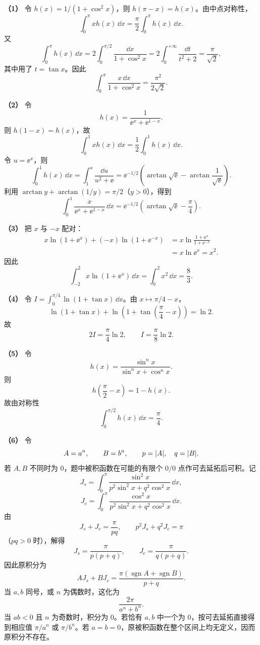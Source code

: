 \begin{xsolution}
\textbf{（1）}\quad
令 $h(x)=1/(1+\cos^2x)$，则 $h(\pi-x)=h(x)$。由中点对称性，
\[
  \int_0^\pi xh(x)\,\dd x
  =\frac\pi2\int_0^\pi h(x)\,\dd x.
\]
又
\[
  \int_0^\pi h(x)\,\dd x
  =2\int_0^{\pi/2}\frac{\dd x}{1+\cos^2x}
  =2\int_0^{+\infty}\frac{\dd t}{t^2+2}
  =\frac\pi{\sqrt2},
\]
其中用了 $t=\tan x$。因此
\[
  \boxed{\int_0^\pi\frac{x\,\dd x}{1+\cos^2x}
  =\frac{\pi^2}{2\sqrt2}}.
\]

\textbf{（2）}\quad
令
\[
  h(x)=\frac1{\ee^x+\ee^{1-x}}.
\]
则 $h(1-x)=h(x)$，故
\[
  \int_0^1xh(x)\,\dd x=\frac12\int_0^1h(x)\,\dd x.
\]
令 $u=\ee^x$，则
\[
  \int_0^1h(x)\,\dd x
  =\int_1^{\ee}\frac{\dd u}{u^2+\ee}
  =\ee^{-1/2}\left(\arctan\sqrt{\ee}-\arctan\frac1{\sqrt\ee}\right).
\]
利用 $\arctan y+\arctan(1/y)=\pi/2$（$y>0$），得到
\[
  \boxed{\int_0^1\frac{x}{\ee^x+\ee^{1-x}}\,\dd x
  =\ee^{-1/2}\left(\arctan\sqrt{\ee}-\frac\pi4\right)}.
\]

\textbf{（3）}\quad
把 $x$ 与 $-x$ 配对：
\begin{align*}
  x\ln(1+\ee^x)+(-x)\ln(1+\ee^{-x})
  &=x\ln\frac{1+\ee^x}{1+\ee^{-x}}\\
  &=x\ln\ee^x=x^2.
\end{align*}
因此
\[
  \int_{-2}^2x\ln(1+\ee^x)\,\dd x
  =\int_0^2x^2\,\dd x
  =\boxed{\frac83}.
\]

\textbf{（4）}\quad
令 $I=\int_0^{\pi/4}\ln(1+\tan x)\,\dd x$。由 $x\mapsto\pi/4-x$，
\[
  \ln(1+\tan x)+
  \ln\left(1+\tan\left(\frac\pi4-x\right)\right)=\ln2.
\]
故
\[
  2I=\frac\pi4\ln2,
  \qquad
  \boxed{I=\frac\pi8\ln2}.
\]

\textbf{（5）}\quad
令
\[
  h(x)=\frac{\sin^n x}{\sin^n x+\cos^n x}.
\]
则
\[
  h\left(\frac\pi2-x\right)=1-h(x).
\]
故由对称性
\[
  \boxed{\int_0^{\pi/2}h(x)\,\dd x=\frac\pi4}.
\]

\textbf{（6）}\quad
令
\[
  A=a^n,\qquad B=b^n,
  \qquad p=\lvert A\rvert,\quad q=\lvert B\rvert.
\]
若 $A,B$ 不同时为 $0$，题中被积函数在可能的有限个 $0/0$ 点作可去延拓后可积。记
\[
  J_s=\int_0^\pi\frac{\sin^2x}{p^2\sin^2x+q^2\cos^2x}\,\dd x,
\]
\[
  J_c=\int_0^\pi\frac{\cos^2x}{p^2\sin^2x+q^2\cos^2x}\,\dd x.
\]
由
\[
  J_s+J_c=\frac\pi{pq},
  \qquad
  p^2J_s+q^2J_c=\pi
\]
（$pq>0$ 时），解得
\[
  J_s=\frac\pi{p(p+q)},
  \qquad
  J_c=\frac\pi{q(p+q)}.
\]
因此原积分为
\[
  AJ_s+BJ_c
  =\boxed{\frac{\pi(\operatorname{sgn}A+\operatorname{sgn}B)}{p+q}}.
\]
当 $a,b$ 同号，或 $n$ 为偶数时，这化为
\[
  \boxed{\frac{2\pi}{a^n+b^n}}.
\]
当 $ab<0$ 且 $n$ 为奇数时，积分为 $0$。若恰有 $a,b$ 中一个为 $0$，按可去延拓直接得到相应值 $\pi/a^n$ 或 $\pi/b^n$。若 $a=b=0$，原被积函数在整个区间上均无定义，因而原积分不存在。
\end{xsolution}


